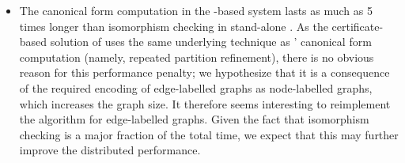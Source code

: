 \begin{itemize}
\item The canonical form computation in the \LTSMIN-based system lasts as much
  as 5 times longer than isomorphism checking in stand-alone \GROOVE. As the
  certificate-based solution of \GROOVE uses the same underlying technique as
  \BLISS' canonical form computation (namely, repeated partition refinement),
  there is no obvious reason for this performance penalty; we hypothesize that
  it is a consequence of the required encoding of edge-labelled \GROOVE graphs
  as node-labelled \BLISS graphs, which increases the graph size. It therefore
  seems interesting to reimplement the \BLISS algorithm for edge-labelled
  graphs. Given the fact that isomorphism checking is a major fraction of the
  total time, we expect that this may further improve the distributed
  performance.
\end{itemize}

